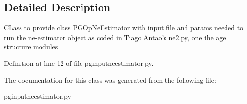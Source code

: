\subsection{Detailed Description}
\begin{DoxyVerb}CLass to provide class PGOpNeEstimator
with input file and params needed to run
the ne-estimator object as coded in Tiago Antao's
ne2.py, one the age structure modules
\end{DoxyVerb}
 

Definition at line 12 of file pginputneestimator.\+py.



The documentation for this class was generated from the following file\+:\begin{DoxyCompactItemize}
\item 
pginputneestimator.\+py\end{DoxyCompactItemize}
